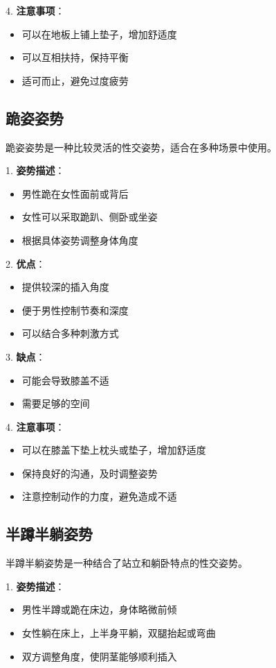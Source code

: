 \documentclass[12pt,UTF8]{ctexbook}
\begin{document}
4. \textbf{注意事项}：
  \begin{itemize}
  \item 可以在地板上铺上垫子，增加舒适度
  \item 可以互相扶持，保持平衡
  \item 适可而止，避免过度疲劳
  \end{itemize}

\subsection{跪姿姿势}

跪姿姿势是一种比较灵活的性交姿势，适合在多种场景中使用。

1. \textbf{姿势描述}：
  \begin{itemize}
  \item 男性跪在女性面前或背后
  \item 女性可以采取跪趴、侧卧或坐姿
  \item 根据具体姿势调整身体角度
  \end{itemize}

2. \textbf{优点}：
  \begin{itemize}
  \item 提供较深的插入角度
  \item 便于男性控制节奏和深度
  \item 可以结合多种刺激方式
  \end{itemize}

3. \textbf{缺点}：
  \begin{itemize}
  \item 可能会导致膝盖不适
  \item 需要足够的空间
  \end{itemize}

4. \textbf{注意事项}：
  \begin{itemize}
  \item 可以在膝盖下垫上枕头或垫子，增加舒适度
  \item 保持良好的沟通，及时调整姿势
  \item 注意控制动作的力度，避免造成不适
  \end{itemize}

\subsection{半蹲半躺姿势}

半蹲半躺姿势是一种结合了站立和躺卧特点的性交姿势。

1. \textbf{姿势描述}：
  \begin{itemize}
  \item 男性半蹲或跪在床边，身体略微前倾
  \item 女性躺在床上，上半身平躺，双腿抬起或弯曲
  \item 双方调整角度，使阴茎能够顺利插入
  \end{itemize}
\end{document}
